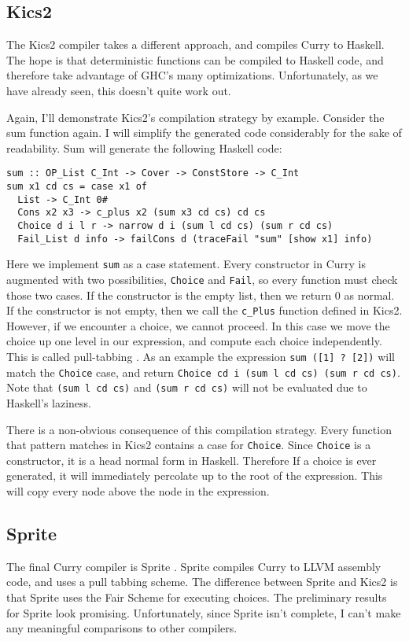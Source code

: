 \subsection{Kics2}

The Kics2 compiler takes a different approach, and compiles Curry to Haskell.
The hope is that deterministic functions can be compiled to Haskell code,
and therefore take advantage of GHC's many optimizations.
Unfortunately, as we have already seen, this doesn't quite work out.

Again, I'll demonstrate Kics2's compilation strategy by example.
Consider the sum function again.
I will simplify the generated code considerably for the sake of readability.
Sum will generate the following Haskell code:

\begin{verbatim}
sum :: OP_List C_Int -> Cover -> ConstStore -> C_Int
sum x1 cd cs = case x1 of
  List -> C_Int 0#
  Cons x2 x3 -> c_plus x2 (sum x3 cd cs) cd cs
  Choice d i l r -> narrow d i (sum l cd cs) (sum r cd cs)
  Fail_List d info -> failCons d (traceFail "sum" [show x1] info)

\end{verbatim}

Here we implement \texttt{sum} as a case statement.
Every constructor in Curry is augmented with two possibilities, \texttt{Choice} and \texttt{Fail},
so every function must check those two cases.
If the constructor is the empty list, then we return 0 as normal.
If the constructor is not empty, then we call the \texttt{c\_Plus} function defined in Kics2.
However, if we encounter a choice, we cannot proceed.
In this case we move the choice up one level in our expression, and compute each choice independently.
This is called pull-tabbing \cite{Antoy11ICLP}.
As an example the expression \texttt{sum ([1] ? [2])} will match the \texttt{Choice} case, and return 
\texttt{Choice cd i (sum l cd cs) (sum r cd cs)}.
Note that \texttt{(sum l cd cs)} and \texttt{(sum r cd cs)} will not be evaluated due to Haskell's laziness.

There is a non-obvious consequence of this compilation strategy.
Every function that pattern matches in Kics2 contains a case for \texttt{Choice}.
Since \texttt{Choice} is a constructor, it is a head normal form in Haskell.
Therefore If a choice is ever generated,
it will immediately percolate up to the root of the expression.
This will copy every node above the node in the expression.

\subsection{Sprite}
The final Curry compiler is Sprite \cite{AntoyJost16LOPSTR}.
Sprite compiles Curry to LLVM assembly code, and uses a pull tabbing scheme.
The difference between Sprite and Kics2 is that Sprite uses the Fair Scheme \cite{fair_scheme} for executing choices.
The preliminary results for Sprite look promising.
Unfortunately, since Sprite isn't complete, I can't make any meaningful comparisons to other compilers.

